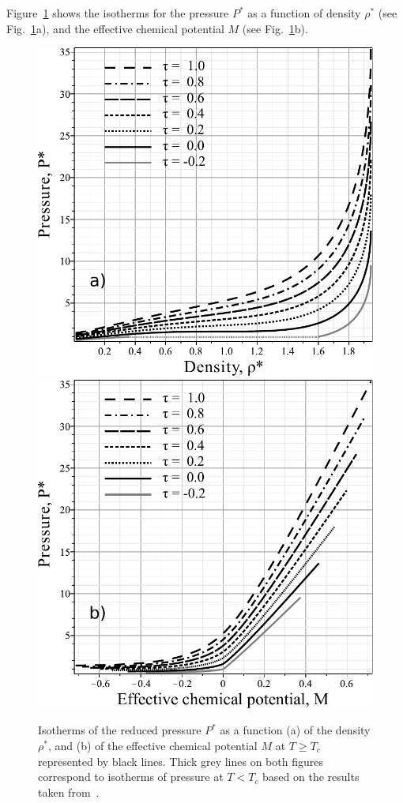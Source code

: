 Figure~\ref{fig1} shows the isotherms for the pressure $P^*$ as a function of density $\rho^*$ (see Fig.~\ref{fig1}a), and the effective chemical potential $M$ (see Fig.~\ref{fig1}b).
\begin{figure}[h!]
	\includegraphics[width=\column]{f1a1.pdf} 
	\includegraphics[width=\column]{f1b1.pdf}
	\vskip-3mm
	\caption{Isotherms of the reduced pressure $P^*$ as a function (a) of the density $\rho^*$, and (b) of the effective chemical potential $M$ at $T \geq T_c$ represented by black lines. Thick grey lines on both figures correspond to isotherms of pressure at $T < T_c$ based on the results taken from~\cite{KozlovskiiDobush2020}.
	}
	\label{fig1}
\end{figure}

